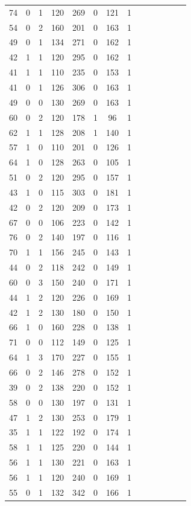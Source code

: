 \documentclass{article}
\begin{document}
\begin{longtable}{|c|c|c|c|c|c|c|c|c|c|c|c|c|c|}
74 & 0 & 1 & 120 & 269 & 0 & 121 & 1\\
54 & 0 & 2 & 160 & 201 & 0 & 163 & 1\\
49 & 0 & 1 & 134 & 271 & 0 & 162 & 1\\
42 & 1 & 1 & 120 & 295 & 0 & 162 & 1\\
41 & 1 & 1 & 110 & 235 & 0 & 153 & 1\\
41 & 0 & 1 & 126 & 306 & 0 & 163 & 1\\
49 & 0 & 0 & 130 & 269 & 0 & 163 & 1\\
60 & 0 & 2 & 120 & 178 & 1 & 96 & 1\\
62 & 1 & 1 & 128 & 208 & 1 & 140 & 1\\
57 & 1 & 0 & 110 & 201 & 0 & 126 & 1\\
64 & 1 & 0 & 128 & 263 & 0 & 105 & 1\\
51 & 0 & 2 & 120 & 295 & 0 & 157 & 1\\
43 & 1 & 0 & 115 & 303 & 0 & 181 & 1\\
42 & 0 & 2 & 120 & 209 & 0 & 173 & 1\\
67 & 0 & 0 & 106 & 223 & 0 & 142 & 1\\
76 & 0 & 2 & 140 & 197 & 0 & 116 & 1\\
70 & 1 & 1 & 156 & 245 & 0 & 143 & 1\\
44 & 0 & 2 & 118 & 242 & 0 & 149 & 1\\
60 & 0 & 3 & 150 & 240 & 0 & 171 & 1\\
44 & 1 & 2 & 120 & 226 & 0 & 169 & 1\\
42 & 1 & 2 & 130 & 180 & 0 & 150 & 1\\
66 & 1 & 0 & 160 & 228 & 0 & 138 & 1\\
71 & 0 & 0 & 112 & 149 & 0 & 125 & 1\\
64 & 1 & 3 & 170 & 227 & 0 & 155 & 1\\
66 & 0 & 2 & 146 & 278 & 0 & 152 & 1\\
39 & 0 & 2 & 138 & 220 & 0 & 152 & 1\\
58 & 0 & 0 & 130 & 197 & 0 & 131 & 1\\
47 & 1 & 2 & 130 & 253 & 0 & 179 & 1\\
35 & 1 & 1 & 122 & 192 & 0 & 174 & 1\\
58 & 1 & 1 & 125 & 220 & 0 & 144 & 1\\
56 & 1 & 1 & 130 & 221 & 0 & 163 & 1\\
56 & 1 & 1 & 120 & 240 & 0 & 169 & 1\\
55 & 0 & 1 & 132 & 342 & 0 & 166 & 1\\

\end{longtable}
\end{document}
